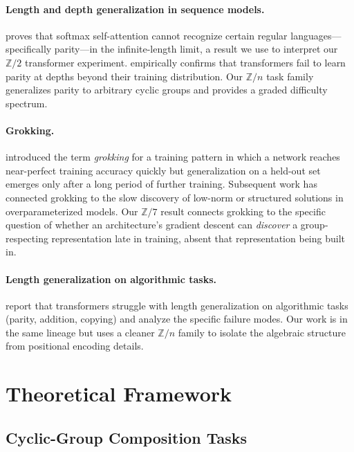 \documentclass[11pt]{article}
\theoremstyle{definition}
\newcommand{\Z}{\mathbb{Z}}
\begin{document}
\paragraph{Length and depth generalization in sequence models.}
\citet{hahn2020theoretical} proves that softmax self-attention cannot
recognize certain regular languages---specifically parity---in the
infinite-length limit, a result we use to interpret our $\Z/2$
transformer experiment. \citet{bhattamishra2020ability} empirically
confirms that transformers fail to learn parity at depths beyond
their training distribution. Our $\Z/n$ task family generalizes
parity to arbitrary cyclic groups and provides a graded difficulty
spectrum.

\paragraph{Grokking.}
\citet{power2022grokking} introduced the term \emph{grokking} for a
training pattern in which a network reaches near-perfect training
accuracy quickly but generalization on a held-out set emerges only
after a long period of further training. Subsequent work
\citep{nanda2023progress, liu2022omnigrok} has connected grokking to
the slow discovery of low-norm or structured solutions in
overparameterized models. Our $\Z/7$ result connects grokking to the
specific question of whether an architecture's gradient descent can
\emph{discover} a group-respecting representation late in training,
absent that representation being built in.

\paragraph{Length generalization on algorithmic tasks.}
\citet{anil2022exploring,zhou2023algorithms,jelassi2024repeat} report
that transformers struggle with length generalization on
algorithmic tasks (parity, addition, copying) and analyze the
specific failure modes. Our work is in the same lineage but uses a
cleaner $\Z/n$ family to isolate the algebraic structure from
positional encoding details.


\section{Theoretical Framework}
\label{sec:framework}

\subsection{Cyclic-Group Composition Tasks}
\end{document}
